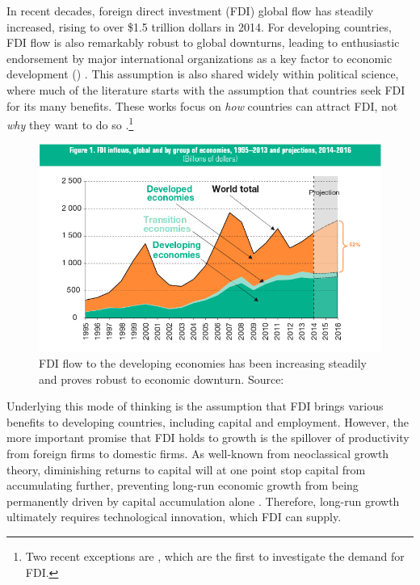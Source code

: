 In recent decades, foreign direct investment (FDI) global flow has steadily increased, rising to over \$1.5 trillion dollars in 2014. For developing countries, FDI flow is also remarkably robust to global downturns, leading to enthusiastic endorsement by major international organizations as a key factor to economic development () \citep{Mallampally1999, WorldEconomicForum2013}. This assumption is also shared widely within political science, where much of the literature starts with the assumption that countries seek FDI for its many benefits. These works focus on \textit{how} countries can attract FDI, not \textit{why} they want to do so \citep{Jensen2003, Li2003, Li2006, Ahlquist2006}.\footnote{Two recent exceptions are \citet{Pinto2013, Pandya2013}, which are the first to investigate the demand for FDI.} 

\begin{figure}[!ht]
\includegraphics[width=\textwidth, height=\textheight,keepaspectratio]{../figure/global_fdi}
\caption{FDI flow to the developing economies has been increasing steadily and proves robust to economic downturn. Source: \citet[xiii]{UNCTAD2014}}
\label{fig:globalfdi}
\end{figure}

Underlying this mode of thinking is the assumption that FDI brings various benefits to developing countries, including capital and employment. However, the more important promise that FDI holds to growth is the spillover of productivity from foreign firms to domestic firms. As well-known from neoclassical growth theory, diminishing returns to capital will at one point stop capital from accumulating further, preventing long-run economic growth from being permanently driven by capital accumulation alone \citep{Solow1956}. Therefore, long-run growth ultimately requires technological innovation, which FDI can supply.


